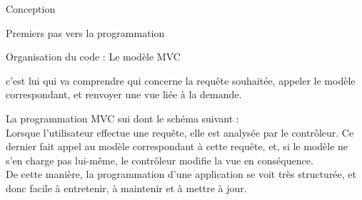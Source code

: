 \documentclass[a4paper, 12pt]{report}
\begin{document}
\begin{part}{Conception}
\begin{chapter}{Premiers pas vers la programmation}
\begin{section}{Organisation du code : Le modèle MVC}
\begin{itemize}
					c'est lui qui va comprendre qui concerne la requête souhaitée, appeler le modèle correspondant, et renvoyer une vue
					liée à la demande.
				\end{itemize}
				La programmation MVC sui dont le schéma suivant : \\
				Lorsque l'utilisateur effectue une requête, elle est analysée par le contrôleur. Ce dernier fait appel au modèle correspondant à
				cette requête, et, si le modèle ne s'en charge pas lui-même, le contrôleur modifie la vue en conséquence.\\
				De cette manière, la programmation d'une application se voit très structurée, et donc facile à entretenir, à maintenir et à mettre
				à jour.

			\end{section}
		\end{chapter}
	\end{part}
\end{document}
